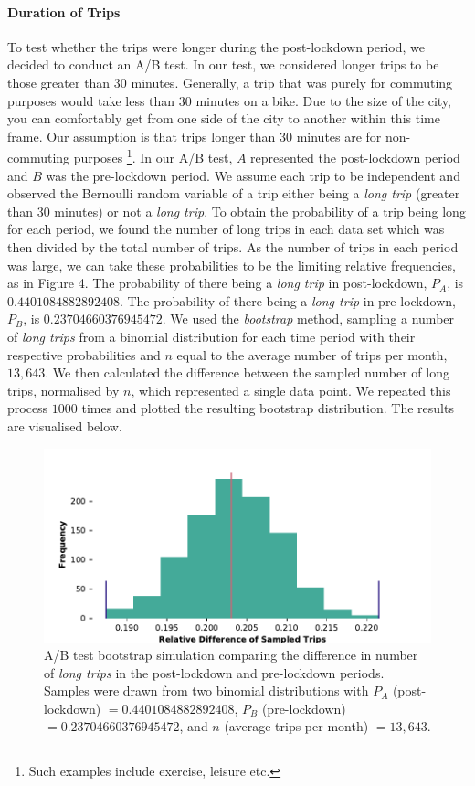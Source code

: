\documentclass[11pt,a4paper]{article}
\begin{document}
\paragraph{Duration of Trips} To test whether the trips were longer during the post-lockdown period, we decided to conduct an A/B test. In our test, we considered longer trips to be those greater than 30 minutes. Generally, a trip that was purely for commuting purposes would take less than 30 minutes on a bike. Due to the size of the city, you can comfortably get from one side of the city to another within this time frame. Our assumption is that trips longer than 30 minutes are for non-commuting purposes \footnote{Such examples include exercise, leisure etc.}. In our A/B test, $A$ represented the post-lockdown period and $B$ was the pre-lockdown period. We assume each trip to be independent and observed the Bernoulli random variable of a trip either being a \emph{long trip} (greater than 30 minutes) or not a \emph{long trip}. To obtain the probability of a trip being long for each period, we found the number of long trips in each data set which was then divided by the total number of trips. As the number of trips in each period was large, we can take these probabilities to be the limiting relative frequencies, as in Figure 4. The probability of there being a \emph{long trip} in post-lockdown, $P_A$, is $0.4401084882892408$. The probability of there being a \emph{long trip} in pre-lockdown, $P_B$, is $0.23704660376945472$. We used the \emph{bootstrap} method, sampling a number of \emph{long trips} from a binomial distribution for each time period with their respective probabilities and $n$ equal to the average number of trips per month, $13,643$. We then calculated the difference between the sampled number of long trips, normalised by $n$, which represented a single data point. We repeated this process $1000$ times and plotted the resulting bootstrap distribution. The results are visualised below.

\begin{figure}[ht]
  \includegraphics{bootstrap.pdf}
  \caption{A/B test bootstrap simulation comparing the difference in number of \emph{long trips} in the post-lockdown and pre-lockdown periods. Samples were drawn from two binomial distributions with $P_A$ (post-lockdown) $= 0.4401084882892408$, $P_B$ (pre-lockdown) $= 0.23704660376945472$, and $n$ (average trips per month) $=13,643$. }
  \label{fds-project:fig:bootstrap}
\end{figure}
\end{document}
